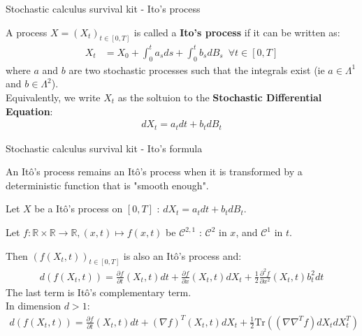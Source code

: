 \begin{frame}{Stochastic calculus survival kit - Ito's process}
    \begin{definition}
    A process $X = (X_t)_{t \in [0, T]}$ is called a \textbf{Ito's process} if it can be written as:
    \begin{align}
        \label{ito sde definition}
        X_t &= X_0 + \int_{0}^{t}a_s ds + \int_{0}^{t} b_s dB_s \,\,\, \forall t \in [0,T]
    \end{align}
    where $a$ and $b$ are two stochastic processes such that the integrals exist (ie $a \in  \Lambda^1$ and 
    $b \in \Lambda^2$).\\
    Equivalently, we write $X_t$ as the soltuion to the \textbf{Stochastic Differential Equation}:
    \begin{align*}
        dX_t = a_t dt + b_t dB_t
    \end{align*}
    \end{definition}
\end{frame}


\begin{frame}{Stochastic calculus survival kit - Ito's formula}
    
\begin{theorem}
An Itô's process remains an Itô's process when it is transformed by a deterministic function that is "smooth enough".

Let $X$ be a Itô's process on $[0,T]$ : $dX_t = a_tdt + b_t dB_t$.

Let $f : \mathbb{R} \times \mathbb{R} \rightarrow \mathbb{R}, (x,t) \mapsto f(x,t)$ be 
$\mathcal{C}^{2,1}$ : $\mathcal{C}^2$ in $x$, and $\mathcal{C}^1$ in $t$.

Then $(f(X_t,t))_{t \in [0,T]}$ is also an Itô's process and:
\begin{align}
    d\left( f(X_t,t) \right) = \frac{\partial f}{\partial t}(X_t,t) dt + \frac{\partial f}{\partial x}(X_t,t) dX_t + \frac{1}{2}\frac{\partial^2 f}{\partial x^2}(X_t,t)b_t^2 dt
\end{align}
The last term is Itô's complementary term.\\
In dimension $d > 1$:
\begin{align}
    d\left( f(X_t,t) \right) = \frac{\partial f}{\partial t}(X_t,t) dt + (\nabla f)^T (X_t,t) dX_t + \frac{1}{2}\text{Tr} \left( (\nabla \nabla^T f) dX_t dX_t^T \right)
\end{align}
\end{theorem}
\end{frame}
